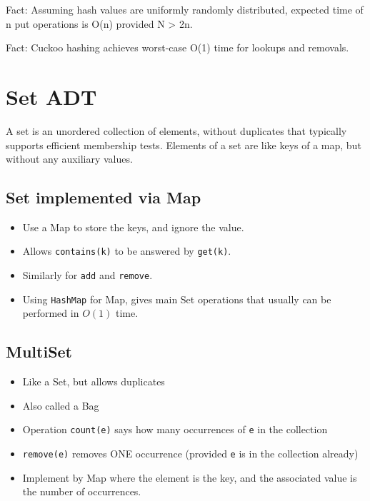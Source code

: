 \documentclass[12pt]{article}
\newcommand{\1}{\space \quad}
\newcommand{\2}{\quad \quad \quad}
\newcommand{\3}{\quad \quad \quad \quad \space}
\newcommand{\4}{\quad \quad \quad \quad \quad \quad}
\begin{document}
\vspace{10pt}
Fact: Assuming hash values are uniformly randomly distributed,
expected time of n put operations is O(n) provided N > 2n.

\vspace{10pt}
Fact: Cuckoo hashing achieves worst-case O(1) time for lookups
and removals.

\section{Set ADT}
A set is an unordered collection of elements, without duplicates
that typically supports efficient membership tests.
Elements of a set are like keys of a map, but without any
auxiliary values.

\subsection{Set implemented via Map}
\begin{itemize}
  \item Use a Map to store the keys, and ignore the value.
  \item Allows \texttt{contains(k)} to be answered by \texttt{get(k)}.
  \item Similarly for \texttt{add} and \texttt{remove}.
  \item Using \texttt{HashMap} for Map, gives main Set operations that usually can be performed in $O(1)$ time.
\end{itemize}

\subsection{MultiSet}
\begin{itemize}
\item Like a Set, but allows duplicates
\item Also called a Bag
\item Operation \texttt{count(e)} says how many occurrences of \texttt{e} in the collection
\item \texttt{remove(e)} removes ONE occurrence (provided \texttt{e} is in the collection already)
\item Implement by Map where the element is the key, and the associated value is the number of occurrences.
\end{itemize}
\end{document}
